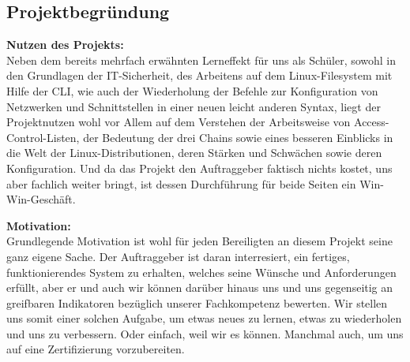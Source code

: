 \subsection{Projektbegründung} 
\label{sec:Projektbegruendung}
	\textbf{Nutzen des Projekts:}\\
    Neben dem bereits mehrfach erwähnten Lerneffekt für uns als Schüler, sowohl in den Grundlagen der IT-Sicherheit, des Arbeitens auf dem Linux-Filesystem mit Hilfe der CLI, wie auch der Wiederholung der Befehle zur Konfiguration von Netzwerken und Schnittstellen in einer neuen leicht anderen Syntax, liegt der Projektnutzen wohl vor Allem auf dem Verstehen der Arbeitsweise von Access-Control-Listen, der Bedeutung der drei Chains sowie eines besseren Einblicks in die Welt der Linux-Distributionen, deren Stärken und Schwächen sowie deren Konfiguration. Und da das Projekt den Auftraggeber faktisch nichts kostet, uns aber fachlich weiter bringt, ist dessen Durchführung für beide Seiten ein Win-Win-Geschäft.
    
    \textbf{Motivation:}\\
    Grundlegende Motivation ist wohl für jeden Bereiligten an diesem Projekt seine ganz eigene Sache. Der Auftraggeber ist daran interresiert, ein fertiges, funktionierendes System zu erhalten, welches seine Wünsche und Anforderungen erfüllt, aber er und auch wir können darüber hinaus uns und uns gegenseitig an greifbaren Indikatoren bezüglich unserer  Fachkompetenz bewerten. Wir stellen uns somit einer solchen Aufgabe, um etwas neues zu lernen, etwas zu wiederholen und uns zu verbessern. Oder einfach, weil wir es können. Manchmal auch, um uns auf eine Zertifizierung vorzubereiten.

